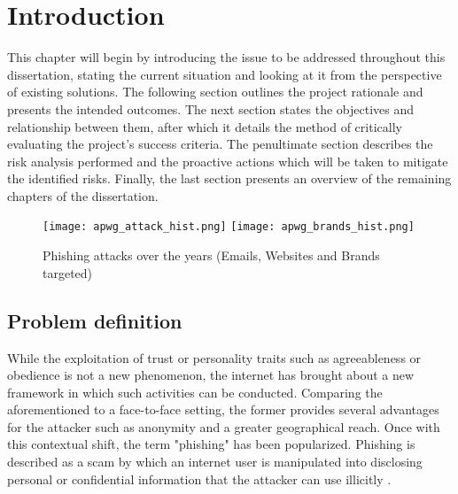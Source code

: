 
\chapter{Introduction}
\label{chap:intro}
This chapter will begin by introducing the issue to be addressed throughout this dissertation, stating the current situation and looking at it from the perspective of existing solutions. The following section outlines the project rationale and presents the intended outcomes. The next section states the objectives and relationship between them, after which it details the method of critically evaluating the project's success criteria. The penultimate section describes the risk analysis performed and the proactive actions which will be taken to mitigate the identified risks. Finally, the last section presents an overview of the remaining chapters of the dissertation.

\begin{figure}[b]
	\centering
	\texttt{[image: apwg\_attack\_hist.png]}
	\texttt{[image: apwg\_brands\_hist.png]}
	\caption{Phishing attacks over the years (Emails, Websites and Brands targeted)}
	\label{fig:PHISHING_HISTORY}
\end{figure}

\section{Problem definition}
While the exploitation of trust or personality traits such as agreeableness or obedience is not a new phenomenon, the internet has brought about a new framework in which such activities can be conducted. Comparing the aforementioned to a face-to-face setting, the former provides several advantages for the attacker such as anonymity and a greater geographical reach. Once with this contextual shift, the term "phishing" has been popularized. Phishing is described as a scam by which an internet user is manipulated into disclosing personal or confidential information that the attacker can use illicitly \citep{MERRIAM_WEBSTER}.

